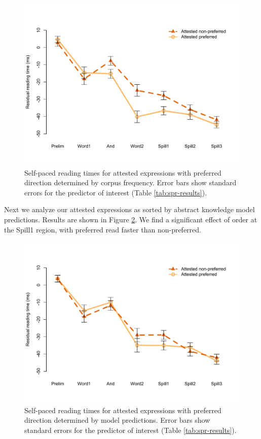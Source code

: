 \documentclass[authoryear]{elsarticle}
\begin{document}
\begin{figure}[t]
\includegraphics[scale=0.8]{spr-attested-sc.pdf}
\caption{Self-paced reading times for attested expressions with preferred direction determined by corpus frequency. Error bars show standard errors for the predictor of interest (Table \ref{tab:spr-results}).} \label{fig:spr-attested-sc}
\end{figure}

Next we analyze our attested expressions as sorted by abstract knowledge model predictions. Results are shown in Figure \ref{fig:spr-attested-model}. We find a significant effect of order at the Spill1 region, with preferred read faster than non-preferred.

\begin{figure}[t]
\includegraphics[scale=0.8]{spr-attested-model.pdf}
\caption{Self-paced reading times for attested expressions with preferred direction determined by model predictions. Error bars show standard errors for the predictor of interest (Table \ref{tab:spr-results}).} \label{fig:spr-attested-model}
\end{figure}
\end{document}
